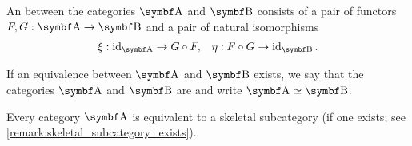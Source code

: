 \begin{definition}\label{def:category_equivalence}
  An  between the categories \( \Cat{A} \) and \( \Cat{B} \) consists of a pair of functors \( F, G: \Cat{A} \to \Cat{B} \) and a pair of natural isomorphisms
  \begin{align*}
    \xi: \Id_{\Cat{A}} \to G \circ F,
    &&
    \eta: F \circ G \to \Id_{\Cat{B}}.
  \end{align*}

  If an equivalence between \( \Cat{A} \) and \( \Cat{B} \) exists, we say that the categories \( \Cat{A} \) and \( \Cat{B} \) are  and write \( \Cat{A} \simeq \Cat{B} \).
 \end{definition}

\begin{proposition}\label{thm:skeletal_subcategory_equivalence}\cite[91]{MacLane1994}
  Every category \( \Cat{A} \) is equivalent to a skeletal subcategory (if one exists; see \cref{remark:skeletal_subcategory_exists}).
\end{proposition}

